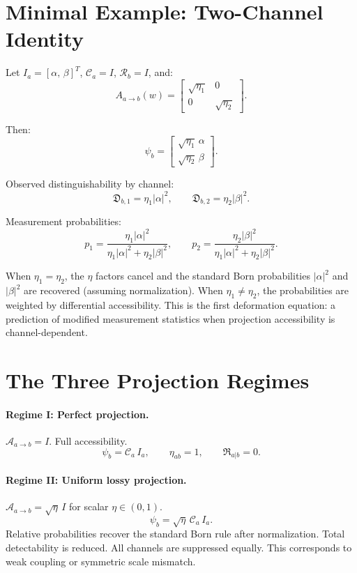 \documentclass[11pt,a4paper,oneside]{article}
\newcommand{\Ia}{I_a}
\newcommand{\Ca}{\mathcal{C}_a}
\newcommand{\Aab}{\mathcal{A}_{a\to b}}
\newcommand{\Rb}{\mathcal{R}_b}
\newcommand{\Rhid}{\mathfrak{R}_{a|b}}
\newcommand{\etaab}{\eta_{ab}}
\newcommand{\psiab}{\psi_b}
\begin{document}
\section{Minimal Example: Two-Channel Identity}

Let $\Ia = [\alpha,\,\beta]^T$, $\Ca = I$, $\Rb = I$, and:
\[
A_{a\to b}(w) = \begin{bmatrix} \sqrt{\eta_1} & 0 \\ 0 & \sqrt{\eta_2} \end{bmatrix}.
\]

Then:
\[
\psiab = \begin{bmatrix} \sqrt{\eta_1}\,\alpha \\ \sqrt{\eta_2}\,\beta \end{bmatrix}.
\]

Observed distinguishability by channel:
\[
\mathfrak{D}_{b,1} = \eta_1|\alpha|^2,\qquad \mathfrak{D}_{b,2} = \eta_2|\beta|^2.
\]

Measurement probabilities:
\[
\boxed{p_1 = \frac{\eta_1|\alpha|^2}{\eta_1|\alpha|^2 + \eta_2|\beta|^2},\qquad p_2 = \frac{\eta_2|\beta|^2}{\eta_1|\alpha|^2 + \eta_2|\beta|^2}.}
\]

When $\eta_1 = \eta_2$, the $\eta$ factors cancel and the standard Born probabilities $|\alpha|^2$ and $|\beta|^2$ are recovered (assuming normalization). When $\eta_1 \neq \eta_2$, the probabilities are weighted by differential accessibility. This is the first deformation equation: a prediction of modified measurement statistics when projection accessibility is channel-dependent.

\section{The Three Projection Regimes}

\paragraph{Regime I: Perfect projection.}
$\Aab = I$. Full accessibility.
\[
\psiab = \Ca\,\Ia,\qquad \etaab = 1,\qquad \Rhid = 0.
\]

\paragraph{Regime II: Uniform lossy projection.}
$\Aab = \sqrt{\eta}\,I$ for scalar $\eta \in (0,1)$.
\[
\psiab = \sqrt{\eta}\,\Ca\,\Ia.
\]
Relative probabilities recover the standard Born rule after normalization. Total detectability is reduced. All channels are suppressed equally. This corresponds to weak coupling or symmetric scale mismatch.
\end{document}
